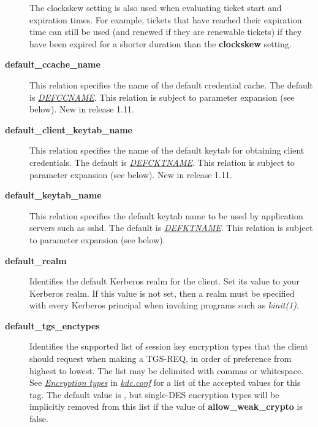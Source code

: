 \documentclass[letterpaper,10pt,english]{sphinxmanual}
\begin{document}
\begin{description}
The clockskew setting is also used when evaluating ticket start
and expiration times.  For example, tickets that have reached
their expiration time can still be used (and renewed if they are
renewable tickets) if they have been expired for a shorter
duration than the \textbf{clockskew} setting.

\item[{\textbf{default\_ccache\_name}}] \leavevmode
This relation specifies the name of the default credential cache.
The default is {\hyperref[mitK5defaults:paths]{\emph{DEFCCNAME}}}.  This relation is subject to parameter
expansion (see below).  New in release 1.11.

\item[{\textbf{default\_client\_keytab\_name}}] \leavevmode
This relation specifies the name of the default keytab for
obtaining client credentials.  The default is {\hyperref[mitK5defaults:paths]{\emph{DEFCKTNAME}}}.  This
relation is subject to parameter expansion (see below).
New in release 1.11.

\item[{\textbf{default\_keytab\_name}}] \leavevmode
This relation specifies the default keytab name to be used by
application servers such as sshd.  The default is {\hyperref[mitK5defaults:paths]{\emph{DEFKTNAME}}}.  This
relation is subject to parameter expansion (see below).

\item[{\textbf{default\_realm}}] \leavevmode
Identifies the default Kerberos realm for the client.  Set its
value to your Kerberos realm.  If this value is not set, then a
realm must be specified with every Kerberos principal when
invoking programs such as \emph{kinit(1)}.

\item[{\textbf{default\_tgs\_enctypes}}] \leavevmode
Identifies the supported list of session key encryption types that
the client should request when making a TGS-REQ, in order of
preference from highest to lowest.  The list may be delimited with
commas or whitespace.  See {\hyperref[admin/conf_files/kdc_conf:encryption-types]{\emph{Encryption types}}} in
{\hyperref[admin/conf_files/kdc_conf:kdc-conf-5]{\emph{kdc.conf}}} for a list of the accepted values for this tag.
The default value is , but single-DES encryption types
will be implicitly removed from this list if the value of
\textbf{allow\_weak\_crypto} is false.


\end{description}
\end{document}
